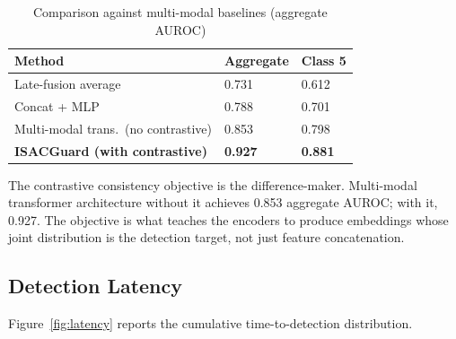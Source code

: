\documentclass[sigconf,nonacm]{acmart}
\begin{document}
\begin{table}[h]
\caption{Comparison against multi-modal baselines (aggregate
AUROC)}
\label{tab:multibaseline}
\small
\begin{tabularx}{\columnwidth}{@{}p{3.0cm}X X@{}}
\toprule
\textbf{Method} & \textbf{Aggregate} & \textbf{Class 5} \\
\midrule
Late-fusion average    & 0.731 & 0.612 \\
Concat + MLP           & 0.788 & 0.701 \\
Multi-modal trans.\ (no contrastive) & 0.853 & 0.798 \\
\textbf{ISACGuard (with contrastive)} & \textbf{0.927} & \textbf{0.881} \\
\bottomrule
\end{tabularx}
\end{table}

The contrastive consistency objective is the difference-maker.
Multi-modal transformer architecture without it achieves 0.853
aggregate AUROC; with it, 0.927. The objective is what teaches the
encoders to produce embeddings whose joint distribution is the
detection target, not just feature concatenation.

\subsection{Detection Latency}

Figure~\ref{fig:latency} reports the cumulative time-to-detection
distribution.
\end{document}
